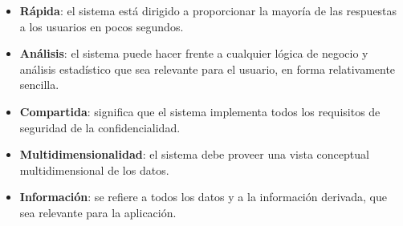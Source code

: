 \documentclass{fancyslides}
\begin{document}
\begin{frame}
\misc
{
\begin{itemize}
  \item \textbf{Rápida}: el sistema está dirigido a proporcionar la mayoría de las respuestas a los usuarios en pocos segundos.
  \item \textbf{Análisis}: el sistema puede hacer frente a cualquier lógica de negocio y análisis estadístico que sea relevante para el usuario, en forma relativamente sencilla.
  \item \textbf{Compartida}: significa que el sistema implementa todos los requisitos de seguridad de la confidencialidad.
  \item \textbf{Multidimensionalidad}: el sistema debe proveer una vista conceptual multidimensional de los datos.
  \item \textbf{Información}: se refiere a todos los datos y a la información derivada, que sea relevante para la aplicación.
\end{itemize}
}
\end{frame}


\begin{frame}
\end{frame}

\begin{frame}
\end{frame}

\begin{frame}
\end{frame}

\begin{frame}
\end{frame}

\begin{frame}
\end{frame}
\end{document}
